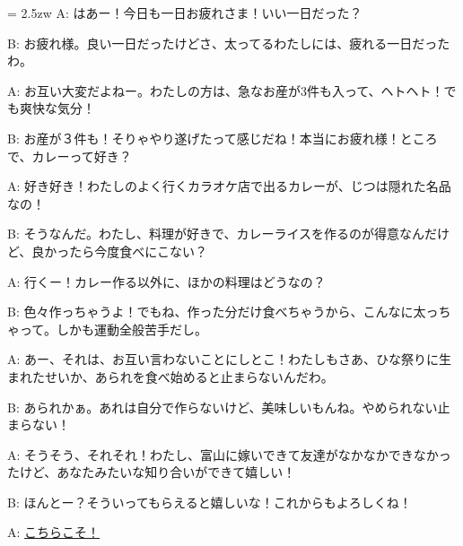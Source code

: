 \documentclass[11pt]{amsart}
\title{}
\author{}
\newenvironment{hangall}[1]{\hangindent = 2.5zw\everypar{\hangindent = 2.5zw}}{}
\begin{document}
\maketitle
\begin{hangall}{}%
A: はあー！今日も一日お疲れさま！いい一日だった？

B: お疲れ様。良い一日だったけどさ、太ってるわたしには、疲れる一日だったわ。

A: お互い大変だよねー。わたしの方は、急なお産が3件も入って、ヘトヘト！でも爽快な気分！

B: お産が３件も！そりゃやり遂げたって感じだね！本当にお疲れ様！ところで、カレーって好き？

A: 好き好き！わたしのよく行くカラオケ店で出るカレーが、じつは隠れた名品なの！

B: そうなんだ。わたし、料理が好きで、カレーライスを作るのが得意なんだけど、良かったら今度食べにこない？

A: 行くー！カレー作る以外に、ほかの料理はどうなの？

B: 色々作っちゃうよ！でもね、作った分だけ食べちゃうから、こんなに太っちゃって。しかも運動全般苦手だし。

A: あー、それは、お互い言わないことにしとこ！わたしもさあ、ひな祭りに生まれたせいか、あられを食べ始めると止まらないんだわ。

B: あられかぁ。あれは自分で作らないけど、美味しいもんね。やめられない止まらない！

A: そうそう、それそれ！わたし、富山に嫁いできて友達がなかなかできなかったけど、あなたみたいな知り合いができて嬉しい！

B: ほんとー？そういってもらえると嬉しいな！これからもよろしくね！

A: \ul{こちらこそ！}\end{hangall}
\end{document}
